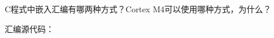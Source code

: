 \documentclass[11pt,letter,notitlepage,UTF8]{ctexart}
\begin{document}
\begin{exercise}[7.12]
	C程式中嵌入汇编有哪两种方式？Cortex M4可以使用哪种方式，为什么？
\end{exercise}
\begin{solution}
	汇编源代码：
	\begin{lstlisting}
	
	
	\end{lstlisting}
\end{solution}



\end{document}
